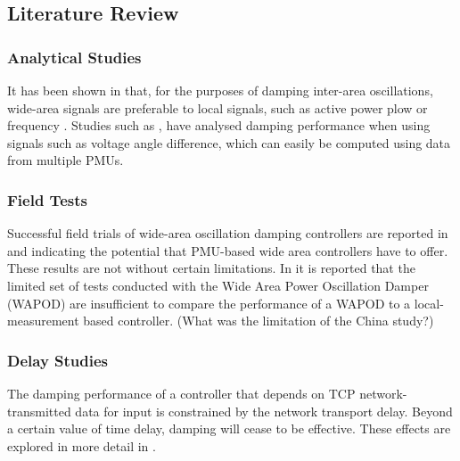 \documentclass[journal]{IEEEtran}
\begin{document}
\subsection{Literature Review}

\subsubsection*{Analytical Studies}

It has been shown in \cite{Yuwa} that, for the purposes of damping inter-area oscillations, wide-area signals are preferable to local signals, such as active power plow or frequency \cite{localREMcomparison}. Studies such as \cite{Yuwa}, have analysed damping performance when using signals such as voltage angle difference, which can easily be computed using data from multiple PMUs. 

\subsubsection*{Field Tests}
Successful field trials of wide-area oscillation damping controllers are reported in \cite{WAPODNorway} and \cite{WAPODChina} indicating the potential that PMU-based wide area controllers have to offer. These results are not without certain limitations. In \cite{WAPODNorway} it is reported that the limited set of tests conducted with the Wide Area Power Oscillation Damper (WAPOD) are insufficient to compare the performance of a WAPOD to a local-measurement based controller. (What was the limitation of the China study?)

\subsubsection*{Delay Studies} The damping performance of a controller that depends on TCP network-transmitted data for input is constrained by the network transport delay. Beyond a certain value of time delay, damping will cease to be effective. These effects are explored in more detail in \cite{CommDelay}.
\end{document}
